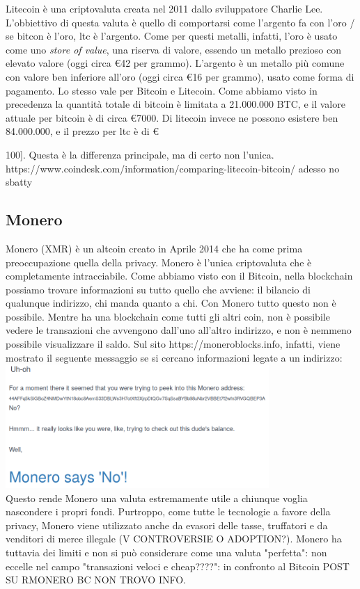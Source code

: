 \documentclass {article}
\begin{document}
Litecoin è una criptovaluta creata nel 2011 dallo sviluppatore Charlie Lee. L'obbiettivo di questa valuta è quello di comportarsi come l'argento fa con l'oro  /  se bitcon è l'oro, ltc è l'argento.
Come per questi metalli, infatti, l'oro è usato come uno \textit{store of value}, una riserva di valore, essendo un metallo prezioso con elevato valore (oggi circa \euro{42} per grammo). L'argento è un metallo più comune con valore ben inferiore all'oro (oggi circa \euro{16} per grammo), usato come forma di pagamento.
Lo stesso vale per Bitcoin e Litecoin. Come abbiamo visto in precedenza la quantità totale di bitcoin è limitata a 21.000.000 BTC, e il valore attuale per bitcoin è di circa \euro{7000}. Di litecoin invece ne possono esistere ben 84.000.000, e il prezzo per ltc è di \euro{100].
Questa è la differenza principale, ma di certo non l'unica.
https://www.coindesk.com/information/comparing-litecoin-bitcoin/ adesso no sbatty


\subsection {Monero}


Monero (XMR) è un altcoin creato in Aprile 2014 che ha come prima preoccupazione quella della privacy.
Monero è l'unica criptovaluta che è completamente intracciabile. Come abbiamo visto con il Bitcoin, nella blockchain possiamo trovare informazioni su tutto quello che avviene: il bilancio di qualunque indirizzo, chi manda quanto a chi.
Con Monero tutto questo non è possibile. Mentre ha una blockchain come tutti gli altri coin, non è possibile vedere le transazioni che avvengono dall'uno all'altro indirizzo, e non è nemmeno possibile visualizzare il saldo.
Sul sito https://moneroblocks.info, infatti, viene mostrato il seguente messaggio se si cercano informazioni legate a un indirizzo:\\

\vspace {0.5cm}
\includegraphics [width = 10cm] {media/monero.png}
\vspace {0.5cm}
\\
Questo rende Monero una valuta estremamente utile a chiunque voglia nascondere i propri fondi.
Purtroppo, come tutte le tecnologie a favore della privacy, Monero viene utilizzato anche da evasori delle tasse, truffatori e da venditori di merce illegale (V CONTROVERSIE O ADOPTION?).
Monero ha tuttavia dei limiti e non si può considerare come una valuta "perfetta": non eccelle nel campo "transazioni veloci e cheap????": in confronto al Bitcoin POST SU RMONERO BC NON TROVO INFO.


}
\end{document}
